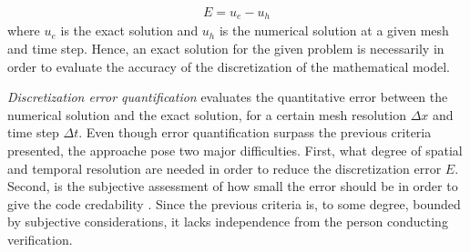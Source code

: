 \begin{align*}
E = u_e - u_h
\end{align*}
 where $u_e$ is the exact solution and $u_h$ is the numerical solution at a given mesh and time step. 
Hence, an exact solution for the given problem is necessarily in order to evaluate the accuracy of the discretization of the mathematical model. 
 

 
 
\textit{Discretization error quantification} evaluates the quantitative error between the numerical solution and the exact solution, for a certain mesh resolution $\Delta x$ and time step $\Delta t$. Even though error quantification surpass the previous criteria presented, the approache pose two major difficulties. First, what degree of spatial and temporal resolution are needed in order to reduce the discretization error $E$. Second, is the subjective assessment of how small the error should be in order to give the code credability \cite{Roache}. Since the previous criteria is, to some degree, bounded by subjective considerations, it lacks independence from the person conducting verification. \\

